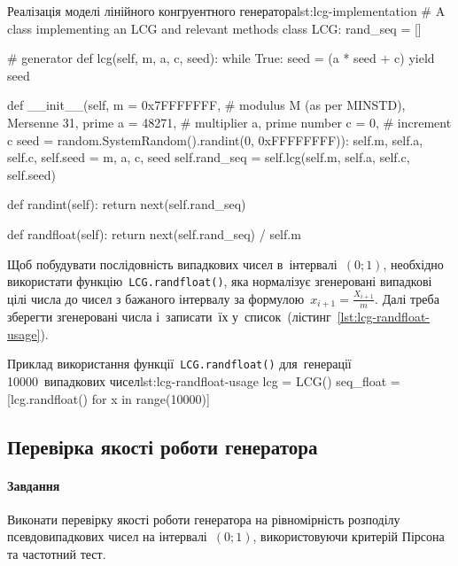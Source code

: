 \documentclass[
	a4paper,
	oneside,
	BCOR = 10mm,
	DIV = 12,
	12pt,
	headings = normal,
]{scrartcl}
\begin{document}
			\begin{listingpython}{Реалізація моделі лінійного конгруентного генератора}{lst:lcg-implementation}
# A class implementing an LCG and relevant methods
class LCG:
    rand_seq = []

    # generator
    def lcg(self, m, a, c, seed):
        while True:
            seed = (a * seed + c) %
            yield seed

    def __init__(self,
                 m = 0x7FFFFFFF, # modulus M (as per MINSTD), Mersenne 31, prime
                 a = 48271, # multiplier a, prime number
                 c = 0, # increment c
                 seed = random.SystemRandom().randint(0, 0xFFFFFFFF)):
        self.m, self.a, self.c, self.seed = m, a, c, seed
        self.rand_seq = self.lcg(self.m, self.a, self.c, self.seed)

    def randint(self):
        return next(self.rand_seq)

    def randfloat(self):
        return next(self.rand_seq) / self.m
			\end{listingpython}

			Щоб побудувати послідовність випадкових чисел в~інтервалі~$(0; 1)$, необхідно використати функцію~\texttt{LCG.randfloat()}, яка нормалізує згенеровані випадкові цілі числа до чисел з бажаного інтервалу за формулою~$x_{i+1} = \frac{X_{i+1}}{m}$.
			Далі треба зберегти згенеровані числа і~записати~їх у~список~(лістинг~\ref{lst:lcg-randfloat-usage}). 

			\begin{listingpython}{Приклад використання функції~\texttt{LCG.randfloat()} для~генерації 10000~випадкових чисел}{lst:lcg-randfloat-usage}
lcg = LCG()
seq_float = [lcg.randfloat() for x in range(10000)]
			\end{listingpython}

		\subsection{Перевірка якості роботи генератора}
			\paragraph{Завдання}
			Виконати перевірку якості роботи генератора на рівномірність розподілу псевдовипадкових чисел на інтервалі~$(0; 1)$, використовуючи критерій Пірсона та частотний тест. 
\end{document}
